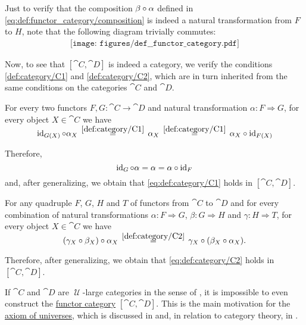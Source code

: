 \begin{defproof}
  Just to verify that the composition \( \beta \mathbin \circ \alpha \) defined in \eqref{eq:def:functor_category/composition} is indeed a natural transformation from \( F \) to \( H \), note that the following diagram trivially commutes:
  \begin{equation}\label{eq:ex:quivers_as_functors/index/diagram}
    \begin{aligned}
      \texttt{[image: figures/def\_\_functor\_category.pdf]}
    \end{aligned}
  \end{equation}

  Now, to see that \( [\cat{C}, \cat{D}] \) is indeed a category, we verify the conditions \ref{def:category/C1} and \ref{def:category/C2}, which are in turn inherited from the same conditions on the categories \( \cat{C} \) and \( \cat{D} \).

   For every two functors \( F, G: \cat{C} \to \cat{D} \) and natural transformation \( \alpha: F \Rightarrow G \), for every object \( X \in \cat{C} \) we have
  \begin{equation*}
    \id_{G(X)} \bincirc \alpha_X
    \reloset{\eqref{def:category/C1}} =
    \alpha_X
    \reloset{\eqref{def:category/C1}} =
    \alpha_X \bincirc \id_{F(X)}
  \end{equation*}

  Therefore,
  \begin{equation*}
    \operatorname{id}_G \mathbin \circ \alpha = \alpha = \alpha \mathbin \circ \operatorname{id}_F
  \end{equation*}
  and, after generalizing, we obtain that \eqref{eq:def:category/C1} holds in \( [\cat{C}, \cat{D}] \).

   For any quadruple \( F \), \( G \), \( H \) and \( T \) of functors from \( \cat{C} \) to \( \cat{D} \) and for every combination of natural transformations \( \alpha: F \Rightarrow G \), \( \beta: G \Rightarrow H \) and \( \gamma: H \Rightarrow T \), for every object \( X \in \cat{C} \) we have
  \begin{equation*}
    (\gamma_X \bincirc \beta_X) \bincirc \alpha_X
    \reloset{\eqref{def:category/C2}} =
    \gamma_X \bincirc (\beta_X \bincirc \alpha_X).
  \end{equation*}

  Therefore, after generalizing, we obtain that \eqref{eq:def:category/C2} holds in \( [\cat{C}, \cat{D}] \).
\end{defproof}

\begin{remark}\label{rem:functor_category_size}
  If \( \cat{C} \) and \( \cat{D} \) are \( \mscrU \)-large categories in the sense of , it is impossible to even construct the \hyperref[def:functor_category]{functor category} \( [\cat{C}, \cat{D}] \). This is the main motivation for the \hyperref[def:axiom_of_universes]{axiom of universes}, which is discussed in  and, in relation to category theory, in .
\end{remark}
